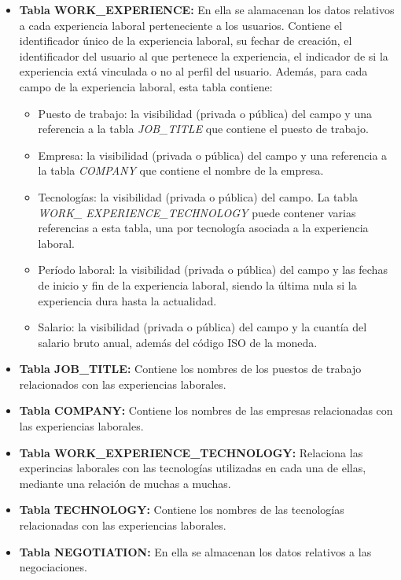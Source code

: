 \documentclass[a4paper, 12pt]{book}
\begin{document}
    \begin{itemize}
        \item \textbf{Tabla WORK\_EXPERIENCE:} En ella se alamacenan los datos relativos a cada experiencia laboral perteneciente a los usuarios.
        Contiene el identificador único de la experiencia laboral, su fechar de creación, el identificador del usuario al que pertenece la experiencia, el indicador de si la experiencia extá vinculada o no al perfil del usuario.
        Además, para cada campo de la experiencia laboral, esta tabla contiene:
        \begin{itemize}
            \item Puesto de trabajo: la visibilidad (privada o pública) del campo y una referencia a la tabla \emph{JOB\_TITLE} que contiene el puesto de trabajo.
            \item Empresa: la visibilidad (privada o pública) del campo y una referencia a la tabla \emph{COMPANY} que contiene el nombre de la empresa.
            \item Tecnologías: la visibilidad (privada o pública) del campo. La tabla \emph{WORK\_ EXPERIENCE\_TECHNOLOGY} puede contener varias referencias a esta tabla, una por tecnología asociada a la experiencia laboral.
            \item Período laboral: la visibilidad (privada o pública) del campo y las fechas de inicio y fin de la experiencia laboral, siendo la última nula si la experiencia dura hasta la actualidad.
            \item Salario: la visibilidad (privada o pública) del campo y la cuantía del salario bruto anual, además del código ISO de la moneda.
        \end{itemize}
        \item \textbf{Tabla JOB\_TITLE:} Contiene los nombres de los puestos de trabajo relacionados con las experiencias laborales.
        \item \textbf{Tabla COMPANY:} Contiene los nombres de las empresas relacionadas con las experiencias laborales.
        \item \textbf{Tabla WORK\_EXPERIENCE\_TECHNOLOGY:} Relaciona las experincias laborales con las tecnologías utilizadas en cada una de ellas, mediante una relación de muchas a muchas.
        \item \textbf{Tabla TECHNOLOGY:} Contiene los nombres de las tecnologías relacionadas con las experiencias laborales.
        \item \textbf{Tabla NEGOTIATION:} En ella se almacenan los datos relativos a las negociaciones.

\end{itemize}
\end{document}
